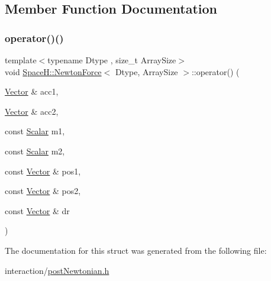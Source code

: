 \subsection{Member Function Documentation}
\mbox{\label{struct_space_h_1_1_newton_force_abef48bbbed814919f3269f9210864380}} 
\subsubsection{\texorpdfstring{operator()()}{operator()()}}
{\footnotesize\ttfamily template$<$typename Dtype , size\+\_\+t Array\+Size$>$ \\
void \mbox{\hyperlink{struct_space_h_1_1_newton_force}{Space\+H\+::\+Newton\+Force}}$<$ Dtype, Array\+Size $>$\+::operator() (\begin{DoxyParamCaption}\item[{\mbox{\hyperlink{struct_space_h_1_1_newton_force_aeb07826be31edb8f1bbaef06c66e9565}{Vector}} \&}]{acc1,  }\item[{\mbox{\hyperlink{struct_space_h_1_1_newton_force_aeb07826be31edb8f1bbaef06c66e9565}{Vector}} \&}]{acc2,  }\item[{const \mbox{\hyperlink{struct_space_h_1_1_newton_force_a26afc180e0b2f65fe0a38aedceb9616f}{Scalar}}}]{m1,  }\item[{const \mbox{\hyperlink{struct_space_h_1_1_newton_force_a26afc180e0b2f65fe0a38aedceb9616f}{Scalar}}}]{m2,  }\item[{const \mbox{\hyperlink{struct_space_h_1_1_newton_force_aeb07826be31edb8f1bbaef06c66e9565}{Vector}} \&}]{pos1,  }\item[{const \mbox{\hyperlink{struct_space_h_1_1_newton_force_aeb07826be31edb8f1bbaef06c66e9565}{Vector}} \&}]{pos2,  }\item[{const \mbox{\hyperlink{struct_space_h_1_1_newton_force_aeb07826be31edb8f1bbaef06c66e9565}{Vector}} \&}]{dr }\end{DoxyParamCaption})\hspace{0.3cm}{\ttfamily [inline]}}



The documentation for this struct was generated from the following file\+:\begin{DoxyCompactItemize}
\item 
interaction/\mbox{\hyperlink{post_newtonian_8h}{post\+Newtonian.\+h}}\end{DoxyCompactItemize}
